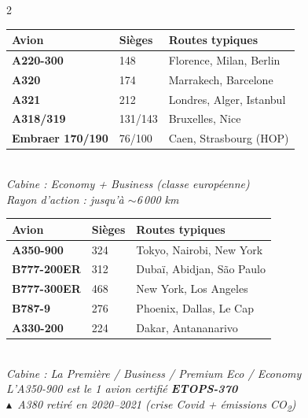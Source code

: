 \documentclass[9pt,a4paper,landscape]{article}
\newcommand{\CORR}{\textcolor{afred}{$\blacktriangle$}}
\begin{document}
\begin{multicols}{2}
\scriptsize

\begin{tcolorbox}[colback=eurlight,colframe=eurblue,title={\textbf{COURT \& MOYEN-COURRIER (Europe, Afrique N.)}},fonttitle=\bfseries\color{white}]
\begin{tabular}{lll}
\toprule
\textbf{Avion} & \textbf{Sièges} & \textbf{Routes typiques} \\
\midrule
\textbf{A220-300} & 148 & Florence, Milan, Berlin \\
\textbf{A320} & 174 & Marrakech, Barcelone \\
\textbf{A321} & 212 & Londres, Alger, Istanbul \\
\textbf{A318/319} & 131/143 & Bruxelles, Nice \\
\textbf{Embraer 170/190} & 76/100 & Caen, Strasbourg (HOP) \\
\bottomrule
\end{tabular}\\[0.1cm]
\textit{Cabine : Economy + Business (classe européenne)}\\
\textit{Rayon d'action : jusqu'à $\sim$6\,000 km}
\end{tcolorbox}

\begin{tcolorbox}[colback=asilight,colframe=asired,title={\textbf{LONG-COURRIER}},fonttitle=\bfseries\color{white}]
\begin{tabular}{lll}
\toprule
\textbf{Avion} & \textbf{Sièges} & \textbf{Routes typiques} \\
\midrule
\textbf{A350-900} & 324 & Tokyo, Nairobi, New York \\
\textbf{B777-200ER} & 312 & Dubaï, Abidjan, São Paulo \\
\textbf{B777-300ER} & 468 & New York, Los Angeles \\
\textbf{B787-9} & 276 & Phoenix, Dallas, Le Cap \\
\textbf{A330-200} & 224 & Dakar, Antananarivo \\
\bottomrule
\end{tabular}\\[0.1cm]
\textit{Cabine : La Première / Business / Premium Eco / Economy}\\
\textit{L'A350-900 est le 1 avion certifié \textbf{ETOPS-370}}\\
\textit{\CORR\ A380 retiré en 2020--2021 (crise Covid + émissions CO\textsubscript{2})}
\end{tcolorbox}


\end{multicols}
\end{document}
